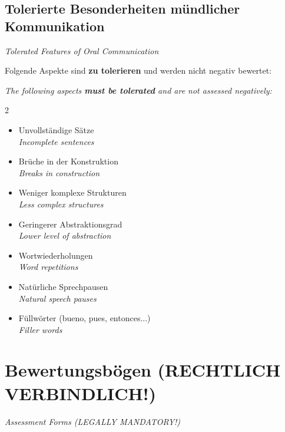 \documentclass[11pt,a4paper]{article}
\newcommand{\bipar}[2]{%
    #1\par\vspace{2pt}%
    {\small\color{englishgray}\textit{#2}}\par\vspace{8pt}%
}
\newcommand{\bisection}[2]{%
    \section{#1}%
    {\small\color{englishgray}\textit{#2}}\par\vspace{6pt}%
}
\newcommand{\bisubsection}[2]{%
    \subsection{#1}%
    {\small\color{englishgray}\textit{#2}}\par\vspace{4pt}%
}
\begin{document}
\bisubsection{Tolerierte Besonderheiten mündlicher Kommunikation}{Tolerated Features of Oral Communication}

\bipar{Folgende Aspekte sind \textbf{zu tolerieren} und werden nicht negativ bewertet:}{The following aspects \textbf{must be tolerated} and are not assessed negatively:}

\begin{multicols}{2}
\begin{itemize}
\item Unvollständige Sätze\\ {\color{englishgray}\textit{Incomplete sentences}}
\item Brüche in der Konstruktion\\ {\color{englishgray}\textit{Breaks in construction}}
\item Weniger komplexe Strukturen\\ {\color{englishgray}\textit{Less complex structures}}
\item Geringerer Abstraktionsgrad\\ {\color{englishgray}\textit{Lower level of abstraction}}
\item Wortwiederholungen\\ {\color{englishgray}\textit{Word repetitions}}
\item Natürliche Sprechpausen\\ {\color{englishgray}\textit{Natural speech pauses}}
\item Füllwörter (bueno, pues, entonces...)\\ {\color{englishgray}\textit{Filler words}}
\end{itemize}
\end{multicols}

\bisection{Bewertungsbögen (RECHTLICH VERBINDLICH!)}{Assessment Forms (LEGALLY MANDATORY!)}
\end{document}
